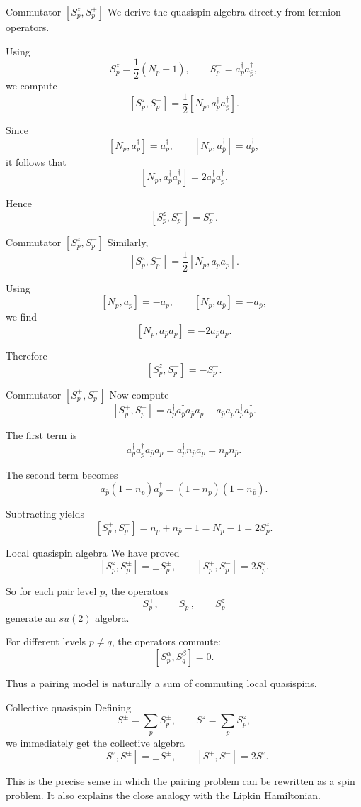 \documentclass[aspectratio=169]{beamer}
\begin{document}
\begin{frame}{Commutator \([S_p^z,S_p^+]\)}
We derive the quasispin algebra directly from fermion operators.

Using
\[
S_p^z = \frac12(N_p-1),\qquad S_p^+ = a_p^\dagger a_{\bar p}^\dagger,
\]
we compute
\[
[S_p^z,S_p^+]
=
\frac12[N_p,a_p^\dagger a_{\bar p}^\dagger].
\]

Since
\[
[N_p,a_p^\dagger]=a_p^\dagger,\qquad [N_p,a_{\bar p}^\dagger]=a_{\bar p}^\dagger,
\]
it follows that
\[
[N_p,a_p^\dagger a_{\bar p}^\dagger]
=
2 a_p^\dagger a_{\bar p}^\dagger.
\]

Hence
\[
[S_p^z,S_p^+] = S_p^+.
\]
\end{frame}

\begin{frame}{Commutator \([S_p^z,S_p^-]\)}
Similarly,
\[
[S_p^z,S_p^-]
=
\frac12[N_p,a_{\bar p}a_p].
\]

Using
\[
[N_p,a_p]=-a_p,\qquad [N_p,a_{\bar p}]=-a_{\bar p},
\]
we find
\[
[N_p,a_{\bar p}a_p] = -2 a_{\bar p}a_p.
\]

Therefore
\[
[S_p^z,S_p^-] = -S_p^-.
\]
\end{frame}

\begin{frame}{Commutator \([S_p^+,S_p^-]\)}
Now compute
\[
[S_p^+,S_p^-]
=
a_p^\dagger a_{\bar p}^\dagger a_{\bar p} a_p
-
a_{\bar p} a_p a_p^\dagger a_{\bar p}^\dagger.
\]

The first term is
\[
a_p^\dagger a_{\bar p}^\dagger a_{\bar p} a_p
=
a_p^\dagger n_{\bar p} a_p
=
n_p n_{\bar p}.
\]

The second term becomes
\[
a_{\bar p}(1-n_p)a_{\bar p}^\dagger
=
(1-n_p)(1-n_{\bar p}).
\]

Subtracting yields
\[
[S_p^+,S_p^-]
=
n_p+n_{\bar p}-1
=
N_p-1
=
2S_p^z.
\]
\end{frame}

\begin{frame}{Local quasispin algebra}
We have proved
\[
[S_p^z,S_p^\pm] = \pm S_p^\pm,
\qquad
[S_p^+,S_p^-] = 2S_p^z.
\]

So for each pair level \(p\), the operators
\[
S_p^+,\qquad S_p^-,\qquad S_p^z
\]
generate an \(su(2)\) algebra.

For different levels \(p\neq q\), the operators commute:
\[
[S_p^\alpha,S_q^\beta]=0.
\]

Thus a pairing model is naturally a sum of commuting local quasispins.
\end{frame}

\begin{frame}{Collective quasispin}
Defining
\[
S^\pm = \sum_p S_p^\pm,
\qquad
S^z = \sum_p S_p^z,
\]
we immediately get the collective algebra
\[
[S^z,S^\pm]=\pm S^\pm,
\qquad
[S^+,S^-]=2S^z.
\]

This is the precise sense in which the pairing problem can be rewritten as a spin problem.
It also explains the close analogy with the Lipkin Hamiltonian.
\end{frame}
\end{document}
